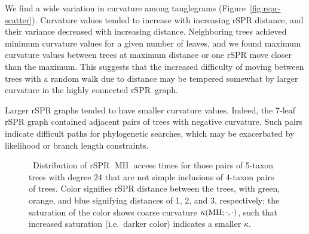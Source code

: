 \documentclass[10pt,twoside,leqno,twocolumn]{article}
\let\MYoriglatexcaption\caption
\renewcommand{\caption}[2][\relax]{\MYoriglatexcaption[#2]{#2}}
\newcommand{\MH}{\operatorname{MH}}
\newcommand{\curvature}[2][]{%
    \ifthenelse{\equal{#1}{}}%
		{\kappa(#2)}%
		{\kappa_{#1}(#2)}%
}
\begin{document}
We find a wide variation in curvature among tanglegrams (Figure~\ref{fig:rspr-scatter}).
Curvature values tended to increase with increasing rSPR distance, and their variance decreased with increasing distance.
Neighboring trees achieved minimum curvature values for a given number of leaves, and we found maximum curvature values between trees at maximum distance or one rSPR move closer than the maximum.
This suggests that the increased difficulty of moving between trees with a random walk due to distance may be tempered somewhat by larger curvature in the highly connected rSPR~graph.

Larger rSPR graphs tended to have smaller curvature values.
Indeed, the 7-leaf rSPR graph contained adjacent pairs of trees with negative curvature.
Such pairs indicate difficult paths for phylogenetic searches, which may be exacerbated by likelihood or branch length constraints.

\begin{figure}
    \caption{\
        Distribution of rSPR $\MH$ access times for those pairs of 5-taxon trees with degree 24 that are not simple inclusions of 4-taxon pairs of trees.
        Color signifies rSPR distance between the trees, with green, orange, and blue signifying distances of 1, 2, and 3, respectively; the saturation of the color shows coarse curvature $\curvature{\MH; \cdot, \cdot}$, such that increased saturation (i.e.\ darker color) indicates a smaller $\kappa$.
        }
	\label{fig:kappa-access}
\end{figure}
\end{document}
